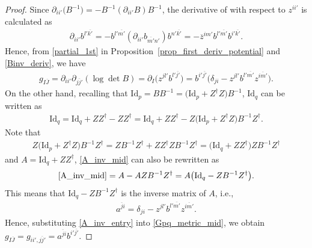 \documentclass[10pt,a4paper]{amsart}
\numberwithin{equation}{section}
\begin{document}
\begin{proof}
Since
$
 \partial_{ii'}
 \bigl(
 B^{-1}
 \bigr)
 =
 -
 B^{-1}
 (
 \partial_{ii'}
 B
 )
 B^{-1}
$,
the derivative of  with respect to $z^{ii'}$ is calculated as
\begin{align}
 \partial_{ii'}
 b^{l'\overline{k'}}
 =
 -
 b^{l'\overline{m'}}
 (
 \partial_{ii'}
 b_{\overline{m'}n'}
 )
 b^{n'\overline{k'}}=
 -
 \overline{z}^{im'}
 b^{l'\overline{m'}}
 b^{i'\overline{k'}}.
 \label{Binv_deriv}
\end{align}
Hence, from \eqref{partial_1st} in Proposition~\ref{prop_first_deriv_potential} and \eqref{Binv_deriv}, we have
\begin{align}
 g_{I\overline{J}}
 =
 \partial_{ii'}
 \partial_{\overline{jj'}}
 (
 \log
 \det
 B
 )
 =
 \partial_{I}
 \bigl(
 z^{jl'}
 b^{l'\overline{j'}}
 \bigr)
 =
 b^{i'\overline{j'}}
 \bigl(
 \delta_{ji}
 -
 z^{jl'}
 b^{l'\overline{m'}}
 z^{\overline{im'}}
 \bigr).
 \label{Gpq_metric_mid}
\end{align}
On the other hand, recalling that
$
 \mathrm{Id}_{p}
 =
 BB^{-1}
 =
 \bigl(
 \mathrm{Id}_{p}
 +
 Z^{\dagger}
 Z
 \bigr)
 B^{-1}
$,
$\mathrm{Id}_{q}$ can be written as
\begin{align}
 \mathrm{Id}_{q}= \mathrm{Id}_{q} + ZZ^{\dagger} - ZZ^{\dagger}
= \mathrm{Id}_{q} + ZZ^{\dagger} - Z \bigl( \mathrm{Id}_{p} + Z^{\dagger} Z \bigr) B^{-1} Z^{\dagger} . \label{A_inv_mid}
\end{align}
Note that
\begin{align*}
 Z\bigl( \mathrm{Id}_{p} + Z^{\dagger} Z\bigr) B^{-1} Z^{\dagger} =
 Z B^{-1} Z^{\dagger} + Z Z^{\dagger} Z B^{-1} Z^{\dagger}
 =\bigl( \mathrm{Id}_{q} + Z Z^{\dagger} \bigr) Z B^{-1} Z^{\dagger}
\end{align*}
and
$ A = \mathrm{Id}_{q} + Z Z^{\dagger}$,
\eqref{A_inv_mid} can also be rewritten as
\begin{align*}
 \eqref{A_inv_mid}= A - A Z B^{-1} Z^{\dagger}= A \bigl( \mathrm{Id}_{q} - Z B^{-1} Z^{\dagger} \bigr).
\end{align*}
This means that
$ \mathrm{Id}_{q} - Z B^{-1} Z^{\dagger}$ is the inverse matrix of $A$, i.e.,
\begin{align}
 a^{\overline{j}i}
 =
 \delta_{ji}
 -
 z^{jl'}
 b^{l'\overline{m'}}
 z^{\overline{im'}}
 .
 \label{A_inv_entry}
\end{align}
Hence, substituting \eqref{A_inv_entry} into \eqref{Gpq_metric_mid}, we obtain
$
 g_{I\overline{J}}
 =
 g_{ii',\overline{jj'}}
 =
 a^{\overline{j}i}
 b^{i'\overline{j'}}
$.
\end{proof}
\end{document}
